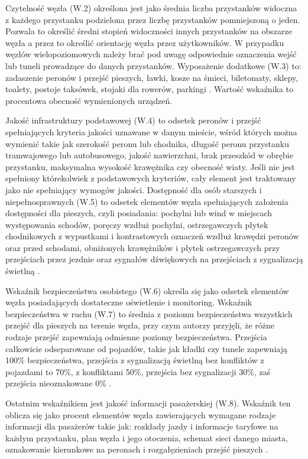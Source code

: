 \documentclass[twoside,12pt]{article}
\begin{document}
Czytelność węzła (W.2) określona jest jako średnia liczba przystanków widoczna z każdego przystanku podzielona przez liczbę przystanków pomniejszoną o jeden. Pozwala to określić średni stopień widoczności innych przystanków na obszarze węzła a przez to określić orientację węzła przez użytkowników. W przypadku węzłów wielopoziomowych należy brać pod uwagę odpowiednie oznaczenia wejść lub tuneli prowadzące do danych przystanków. Wyposażenie dodatkowe (W.3) to: zadaszenie peronów i przejść pieszych, ławki, kosze na śmieci, biletomaty, sklepy, toalety, postoje taksówek, stojaki dla rowerów, parkingi \cite{metodyka}. Wartość wskaźnika to procentowa obecność wymienionych urządzeń.

Jakość infrastruktury podstawowej (W.4) to odsetek peronów i przejść spełniających kryteria jakości uznawane w danym mieście, wśród których można wymienić takie jak szerokość peronu lub chodnika, długość peronu przystanku tramwajowego lub autobusowego, jakość
nawierzchni, brak przeszkód w obrębie przystanku, maksymalna wysokość krawężnika czy obecność wiaty. Jeśli nie jest spełniony którekolwiek z podstawowych kryteriów, cały element jest traktowany jako nie spełniający wymogów jakości. Dostępność dla osób starszych i niepełnosprawnych (W.5) to odsetek elementów węzła spełniających założenia dostępności dla pieszych, czyli posiadania: pochylni lub wind w miejscach występowania schodów, poręczy wzdłuż pochylni, ostrzegawczych płytek chodnikowych z wypustkami i kontrastowych oznaczeń wzdłuż krawędzi peronów oraz przed schodami, obniżonych krawężników i płytek ostrzegawczych przy przejściach przez jezdnie oraz sygnałów dźwiękowych na przejściach z sygnalizacją świetlną \cite{metodyka}.  

Wskaźnik bezpieczeństwa osobistego (W.6) określa się jako odsetek elementów węzła posiadających dostateczne oświetlenie i monitoring. Wskaźnik bezpieczeństwa w ruchu (W.7) to średnia z poziomu bezpieczeństwa wszystkich przejść dla pieszych na terenie węzła, przy czym autorzy przyjęli, że różne rodzaje przejść zapewniają odmienne poziomy bezpieczeństwa. Przejścia całkowicie odseparowane od pojazdów, takie jak kładki czy tunele zapewniają 100\% bezpieczeństwa, przejścia z sygnalizacją świetlną bez konfliktów z pojazdami to 70\%, z konfliktami 50\%, przejścia bez sygnalizacji 30\%, zaś przejścia nieoznakowane 0\% \cite{metodyka}.

Ostatnim wskaźnikiem jest jakość informacji pasażerskiej (W.8). Wskaźnik ten oblicza się jako procent elementów węzła zawierających wymagane rodzaje informacji dla pasażerów takie jak: rozkłady jazdy i informacje taryfowe na każdym przystanku, plan węzła i jego otoczenia, schemat sieci danego miasta, oznakowanie kierunkowe na peronach i rozgałęzieniach przejść pieszych \cite{metodyka}.
\end{document}
